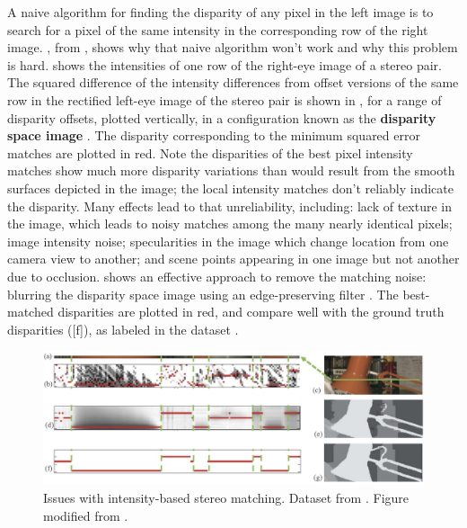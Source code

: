 A naive algorithm for finding the disparity of any pixel in the left image is to search for a pixel of the same intensity  in the corresponding row of the right image.  \Fig{\ref{fig:stereolamp}}, from \cite{Hosni2013}, shows why that naive algorithm won't work and why this problem is hard.  shows the intensities of one row of the right-eye image of a stereo pair. The squared difference of the intensity differences from offset versions of the same row in the rectified left-eye image of the stereo pair is shown in , for a range of disparity offsets, plotted vertically, in a configuration known as the {\bf disparity space image} \cite{Scharstein2002}.  The disparity corresponding to the minimum squared error matches are plotted in red.  Note the disparities of the best pixel intensity matches show much more disparity variations than would result from the smooth surfaces depicted in the image; the local intensity matches don't reliably indicate the disparity.  Many effects lead to that unreliability, including: lack of texture in the image, which leads to noisy matches among the many nearly identical pixels; image intensity noise; specularities in the image which change location from one camera view to another; and scene points appearing in one image but not another due to occlusion.  shows an effective approach to remove the matching noise:  blurring the disparity space image using an edge-preserving filter \cite{Hosni2013}.  The best-matched disparities are plotted in red, and compare well with the ground truth disparities (\fig{\ref{fig:stereolamp}}[f]), as labeled in the dataset \cite{Scharstein2002}.


\begin{figure}[t]
    \centerline{
        \includegraphics[width=1\linewidth]{figures/stereo/stereolamp.jpg}}
    \caption{Issues with intensity-based stereo matching.
        Dataset from \cite{Scharstein2002}. Figure modified from \cite{Hosni2013}.}
    \label{fig:stereolamp}
\end{figure}

